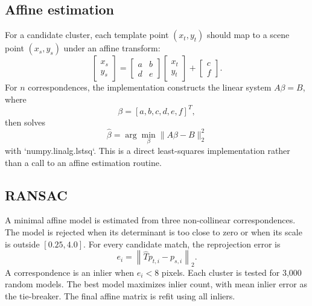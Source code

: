 \documentclass[10pt,twocolumn]{article}
\begin{document}
\subsection{Affine estimation}
For a candidate cluster, each template point $(x_t,y_t)$ should map to a scene point $(x_s,y_s)$ under an affine transform:
\begin{equation}
 \begin{bmatrix}x_s\\y_s\end{bmatrix}
 =
 \begin{bmatrix}a&b\\d&e\end{bmatrix}
 \begin{bmatrix}x_t\\y_t\end{bmatrix}
 +
 \begin{bmatrix}c\\f\end{bmatrix}.
\end{equation}
For $n$ correspondences, the implementation constructs the linear system $A\beta=B$, where
\begin{equation}
 \beta=[a,b,c,d,e,f]^T,
\end{equation}
then solves
\begin{equation}
 \hat{\beta}=\arg\min_{\beta}\|A\beta-B\|_2^2
\end{equation}
with `numpy.linalg.lstsq`. This is a direct least-squares implementation rather than a call to an affine estimation routine.

\subsection{RANSAC}
A minimal affine model is estimated from three non-collinear correspondences. The model is rejected when its determinant is too close to zero or when its scale is outside $[0.25,4.0]$. For every candidate match, the reprojection error is
\begin{equation}
 e_i=\left\|\hat{T}p_{t,i}-p_{s,i}\right\|_2.
\end{equation}
A correspondence is an inlier when $e_i<8$ pixels. Each cluster is tested for 3,000 random models. The best model maximizes inlier count, with mean inlier error as the tie-breaker. The final affine matrix is refit using all inliers.
\end{document}
